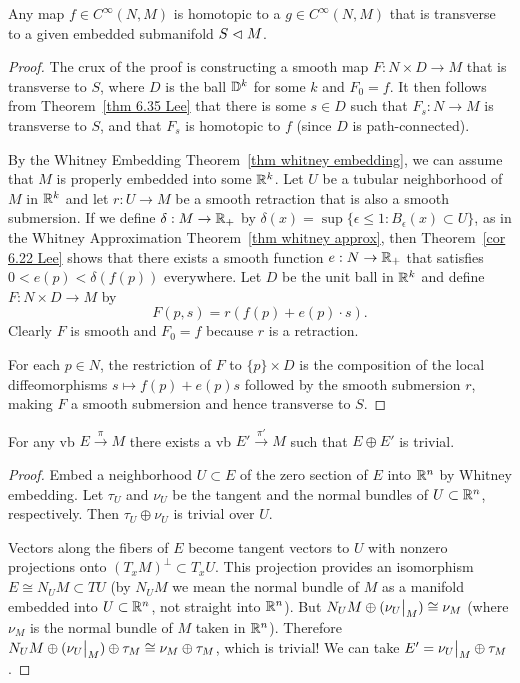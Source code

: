 \begin{thm}\label{transverse homotopy thm}
Any map $f\in C^\infty(N,M)$ is homotopic to a $g\in C^\infty(N,M)$ that is transverse to a given embedded submanifold $S\vartriangleleft M$.
\end{thm}
\begin{proof}
The crux of the proof is constructing a smooth map $F:N\times D\to M$ that is transverse to $S$, where $D$ is the ball $\mathbb{D}^k$ for some $k$ and $F_0=f$. It then follows from Theorem~\ref{thm 6.35 Lee} that there is some $s\in D$ such that $F_s:N\to M$ is transverse to $S$, and that $F_s$ is homotopic to $f$ (since $D$ is path-connected).

By the Whitney Embedding Theorem~\ref{thm whitney embedding}, we can assume that $M$ is properly embedded into some $\mathbb{R}^k$. Let $U$ be a tubular neighborhood of $M$ in $\mathbb{R}^k$ and let $r:U\to M$ be a smooth retraction that is also a smooth submersion. If we define $\delta:M\to \mathbb{R}_+$ by $\delta(x)=\sup\{\epsilon\leq 1:B_\epsilon(x)\subset U\}$, as in the Whitney Approximation Theorem~\ref{thm whitney approx}, then Theorem~\ref{cor 6.22 Lee} shows that there exists a smooth function $e:N\to \mathbb{R}_+$ that satisfies $0<e(p)<\delta(f(p))$ everywhere. Let $D$ be the unit ball in $\mathbb{R}^k$ and define $F:N\times D\to M$ by
\[F(p,s)=r(f(p)+e(p)\cdot s).\]
Clearly  $F$ is smooth and $F_0=f$ because $r$ is a retraction. 

For each $p\in N$, the restriction of $F$ to $\{p\}\times D$ is the composition of the local diffeomorphisms $s\mapsto f(p)+e(p)s$ followed by the smooth submersion $r$, making $F$ a smooth submersion and hence transverse to $S$.
\end{proof}


\begin{thm}\label{every VB is summand of trivial VB}
    For any \gls{vb} $E\overset{\pi}{\to} M$ there exists a \gls{vb} $E'\overset{\pi'}{\to} M$ such that $E\oplus E'$ is trivial.
\end{thm}
\begin{proof}
    Embed a neighborhood $U\subset E$ of the zero section of $E$ into $\mathbb{R}^n$ by Whitney embedding. Let $\tau_U$ and $\nu_U$ be the tangent and the normal bundles of $U\subset \mathbb{R}^n$, respectively. Then $\tau_U\oplus \nu_U$ is trivial over $U$.
    
    Vectors along the fibers of $E$ become tangent vectors to $U$ with nonzero projections onto $(T_x M)^\perp\subset T_x U$. This projection provides an isomorphism $E\cong N_U M\subset TU$ (by $N_U M$ we mean the normal bundle of $M$ as a manifold embedded into $U\subset \mathbb{R}^n$, not straight into $\mathbb{R}^n$). But $N_U M\oplus (\restr{\nu_U}{M})\cong \nu_M$ (where $\nu_M$ is the normal bundle of $M$ taken in $\mathbb{R}^n$). Therefore $N_U M\oplus (\restr{\nu_U}{M})\oplus \tau_M\cong \nu_M\oplus \tau_M $, which is trivial! We can take $E'=\restr{\nu_U}{M}\oplus \tau_M$.
\end{proof}

